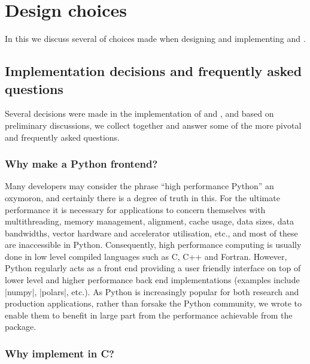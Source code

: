 \section{Design choices}
\label{sec:design_choices}

In this  we discuss several of choices made when designing and implementing \arv and \pyarv. 

\subsection{Implementation decisions and frequently asked questions}

Several decisions were made in the implementation of \arv and \pyarv, and based on preliminary discussions, we collect together and answer some of the more pivotal and frequently asked questions. 

\subsubsection{Why make a Python frontend?}

Many developers may consider the phrase ``high performance Python'' an oxymoron, and certainly there is a degree of truth in this. For the ultimate performance it is necessary for applications to concern themselves with multithreading, memory management, alignment, cache usage, data sizes, data bandwidths, vector hardware and accelerator utilisation, etc., and most of these are inaccessible in Python. Consequently, high performance computing is usually done in low level compiled languages such as C, C++ and Fortran. However, Python regularly acts as a front end providing a user friendly interface on top of lower level and higher performance back end implementations (examples include \inlineplain|numpy|, \inlineplain|polars|, etc.). As Python is increasingly popular for both research and production applications, rather than forsake the Python community, we wrote \pyarv to enable them to benefit in large part from the performance achievable from the \arv package. 

\subsubsection{Why implement \arv in C?}

